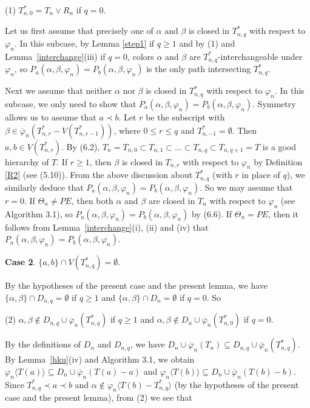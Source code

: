 \documentclass[11pt]{article}
\newcommand{\phibar}{\overline{\varphi}}
\begin{document}
(1) $T_{n,0}^*= T_{n}\vee R_n$ if $q=0$.  

Let us first assume that precisely one of $\alpha$ and $\beta$ is closed in $T_{n,q}^*$ with respect to $\varphi_n$. In
this subcase, by Lemma \ref{step1} if $q \ge 1$ and by (1) and Lemma~\ref{interchange}(iii) if $q=0$, colors  
$\alpha$ and $\beta$ are $T_{n,q}^*$-interchangeable under $\varphi_n$, so $P_{a}(\alpha,\beta,\varphi_n)=P_{b}(\alpha,
\beta,\varphi_n)$ is the only path intersecting $T_{n,q}^*$.  

Next we assume that neither $\alpha$ nor $\beta$ is closed in $T_{n,q}^*$ with respect to $\varphi_n$. In this subcase,
we only need to show that $P_{a}(\alpha,\beta,\varphi_n)=P_{b}(\alpha,\beta,\varphi_n)$. Symmetry allows us to assume
that $a \prec b$. Let $r$ be the subscript with $\beta\in\phibar_n(T_{n,r}^*-V(T_{n,r-1}^*))$, where $0\leq r \le q$ 
and $T_{n,-1}^*=\emptyset$. Then $a, b \in V(T_{n,r}^*)$. By (6.2),  $T_n=T_{n,0} \subset T_{n,1} \subset \ldots \subset 
T_{n,q} \subset T_{n,q+1}=T$ is a good hierarchy of $T$. If $r \ge 1$, then $\beta$ is closed in $T_{n,r}$ with respect 
to $\varphi_n$ by Definition \ref{R2} (see (5.10)). From the above discussion about $T_{n,q}^*$ (with $r$ in place of $q$), 
we similarly deduce that $P_{a}(\alpha,\beta,\varphi_n)=P_{b}(\alpha,\beta,\varphi_n)$.  So we may assume that $r=0$.  If 
$\Theta_n\ne PE$, then both $\alpha$ and $\beta$ are closed in $T_n$ with respect to $\varphi_n$ (see Algorithm 3.1), so $P_{a}(\alpha,\beta,\varphi_n)=P_{b}(\alpha,\beta,\varphi_n)$ by (6.6). If $\Theta_n =PE$, then it follows from Lemma~\ref{interchange}(i), (ii) and (iv) that $P_{a}(\alpha,\beta,\varphi_n)=P_{b}(\alpha,\beta,\varphi_n)$. 
	
{\bf Case 2}. $\{a,b\} \cap V(T_{n,q}^*)=\emptyset$.
	
By the hypotheses of the present case and the present lemma, we have $\{\alpha, \beta\}\cap D_{n,q}=\emptyset$ if 
$q \ge 1$ and $\{\alpha, \beta\} \cap D_{n}=\emptyset$ if $q=0$. So 

(2) $\alpha, \beta \notin D_{n,q}\cup \phibar_n(T_{n,q}^*)$ if $q \ge 1$ and 
$\alpha, \beta \notin D_{n}\cup \phibar_n(T_{n,0}^*)$ if $q=0$. 

\noindent By the definitions of $D_n$ and $D_{n,q}$, we have $D_n \cup \phibar_n(T_n) \subseteq D_{n,q}\cup \phibar_n(T_{n,q}^*)$. By Lemma~\ref{hku}(iv) 
and Algorithm 3.1, we obtain $\varphi_n\langle T(a) \rangle\subseteq D_n\cup \phibar_n(T(a)-a)$ and $\varphi_n\langle T(b) \rangle\subseteq D_n\cup \phibar_n(T(b)-b)$. 
Since $T_{n,q}^*\prec a \prec b$ and $\alpha \notin \varphi_n \langle T(b) -  T_{n,q}^* \rangle$ (by the hypotheses of the present case and the present lemma), 
from (2) we see that 
\end{document}
